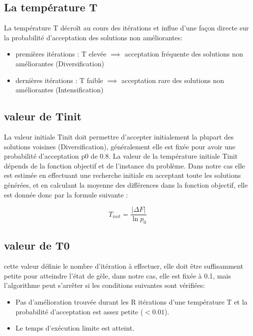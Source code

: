 \documentclass[12pt]{article}
\begin{document}
\subsection{La température T}
La température T décroît au cours des itérations et influe d’une façon directe sur la probabilité d’acceptation des solutions non améliorantes: 
\begin{itemize}
    \item premières itérations : T elevée $\implies $ acceptation fréquente des solutions non améliorantes (Diversification)
    \item dernières itérations : T faible $\implies $ acceptation rare des solutions non améliorantes (Intensification) 
    
\end{itemize}

\subsection{valeur de Tinit}
La valeur initiale Tinit doit permettre d’accepter initialement la plupart des solutions voisines (Diversification), généralement elle est fixée pour avoir une probabilité d’acceptation p0 de 0.8. 
La valeur de la température initiale Tinit dépends de la fonction objectif et de l’instance du problème. Dans notre cas elle est estimée en effectuant une recherche initiale en acceptant toute les solutions générées, et en calculant la moyenne des différences dans la fonction objectif, elle est donnée donc par la formule suivante : 

\begin{equation}
    T_{init} = \frac{|\Delta F|}{\ln p_{0}}
\end{equation}
\subsection{valeur de T0}
cette valeur définie le nombre d’itération à effectuer, elle doit être suffisamment petite pour atteindre l’état de gèle, dans notre cas, elle est fixée à 0.1, mais l’algorithme  peut s’arrêter si les conditions suivantes sont vérifiées: 
\begin{itemize}
    \item Pas d’amélioration trouvée durant les R itérations d’une température T
    et la probabilité d’acceptation est assez petite ($<0.01$).
    \item Le temps d'exécution limite est atteint.
\end{itemize}
\end{document}

